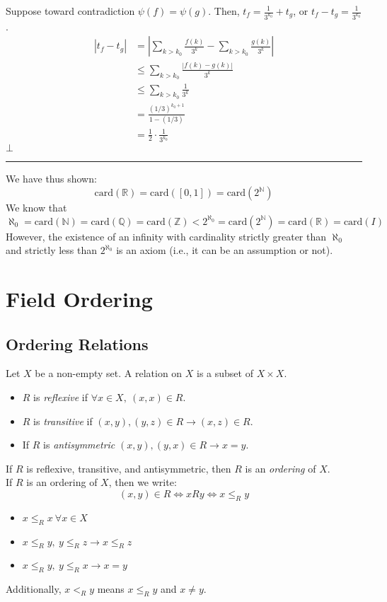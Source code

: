 \documentclass[10pt]{extarticle}
\newcommand{\card}{\text{card}}
\newcommand{\N}{\mathbb{N}}
\newcommand{\Q}{\mathbb{Q}}
\newcommand{\Z}{\mathbb{Z}}
\newcommand{\R}{\mathbb{R}}
\begin{document}
\begin{description}
          Suppose toward contradiction $\psi(f) = \psi(g)$. Then, $t_f = \frac{1}{3^{k_0}} + t_g$, or $t_f - t_g = \frac{1}{3^{k_0}}$.
          \begin{align*}
            |t_f-t_g| &= |\sum_{k>k_0}\frac{f(k)}{3^k} - \sum_{k>k_0}\frac{g(k)}{3^k}|\\
                      &\leq \sum_{k>k_0}\frac{|f(k)-g(k)|}{3^k}\\
                      &\leq \sum_{k>k_0}\frac{1}{3^{k}}\\
                      &= \frac{(1/3)^{k_0+1}}{1-(1/3)}\\
                      &= \frac{1}{2}\cdot\frac{1}{3^{k_0}}
          \end{align*}
          $\bot$
    \end{description}
    \begin{center}
      \rule{0.5\textwidth}{0.4pt}
    \end{center}
    We have thus shown:
    \[
      \card(\R) = \card([0,1]) = \card(2^{\N})
    \] 
    We know that \[\aleph_0 = \card(\N) = \card(\Q) = \card(\Z) < 2^{\aleph_0} = \card(2^{\N}) = \card(\R) = \card(I)\] However, the existence of an infinity with cardinality strictly greater than $\aleph_0$ and strictly less than $2^{\aleph_0}$ is an axiom (i.e., it can be an assumption or not).\\
  \section{Field Ordering}%
  \subsection{Ordering Relations}%
    Let $X$ be a non-empty set. A relation on $X$ is a subset of $X\times X$.
    \begin{itemize}
      \item $R$ is \textsl{reflexive} if $\forall x\in X,~(x,x)\in R$.
      \item $R$ is \textsl{transitive} if $(x,y),(y,z)\in R \rightarrow (x,z)\in R$.
      \item If $R$ is \textsl{antisymmetric} $(x,y),(y,x)\in R\rightarrow x=y$. 
    \end{itemize}
    If $R$ is reflexive, transitive, and antisymmetric, then $R$ is an \textsl{ordering} of $X$.\\

    If $R$ is an ordering of $X$, then we write:
    \[
      (x,y)\in R \Leftrightarrow xRy \Leftrightarrow x\leq_{R} y
    \] 
    \begin{itemize}
      \item $x\leq_{R}x~\forall x\in X$
      \item $x\leq_R y,~y\leq_R z \rightarrow x\leq_R z$
      \item $x\leq_R y,~y\leq_R x \rightarrow x=y$
    \end{itemize}
    Additionally, $x<_R y$ means $x\leq_R y$ and $x\neq y$.
\end{document}
